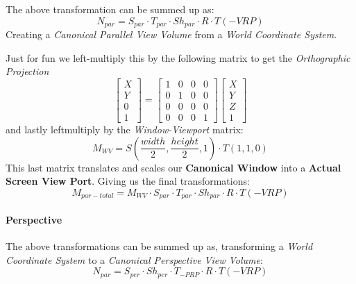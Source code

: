 \documentclass{article}
\begin{document}
The above transformation can be summed up as:
\begin{equation*}
    N_{par} = S_{par} \cdot T_{par} \cdot Sh_{par} \cdot R \cdot T(-VRP)
\end{equation*}
Creating a \emph{Canonical Parallel View Volume} from a \emph{World Coordinate System}.

Just for fun we left-multiply this by the following matrix to get the \emph{Orthographic Projection}
\begin{equation*}
    \begin{bmatrix}
        X\\
        Y\\
        0\\
        1
    \end{bmatrix}=
    \begin{bmatrix}
        1 & 0 & 0 & 0\\
        0 & 1 & 0 & 0\\
        0 & 0 & 0 & 0\\
        0 & 0 & 0 & 1
    \end{bmatrix}
    \begin{bmatrix}
        X\\
        Y\\
        Z\\
        1
    \end{bmatrix}
\end{equation*}
and lastly leftmultiply by the \emph{Window-Viewport} matrix:
\begin{equation*}
    M_{WV} = S(\frac{width}{2},\frac{height}{2},1) \cdot T(1,1,0)
\end{equation*}
This last matrix translates and scales our \textbf{Canonical Window}
into a \textbf{Actual Screen View Port}.
Giving us the final transformations:
\begin{equation*}
    M_{par-total} = M_{WV} \cdot S_{par} \cdot T_{par} \cdot Sh_{par} \cdot R \cdot T(-VRP)
\end{equation*}

\paragraph{Perspective}
The above transformations can be summed up as, transforming a 
\emph{World Coordinate System} to a \emph{Canonical Perspective View Volume}:
\begin{equation*}
    N_{par} = S_{per} \cdot Sh_{per} \cdot T_{-PRP} \cdot R \cdot T(-VRP)
\end{equation*}
\end{document}
